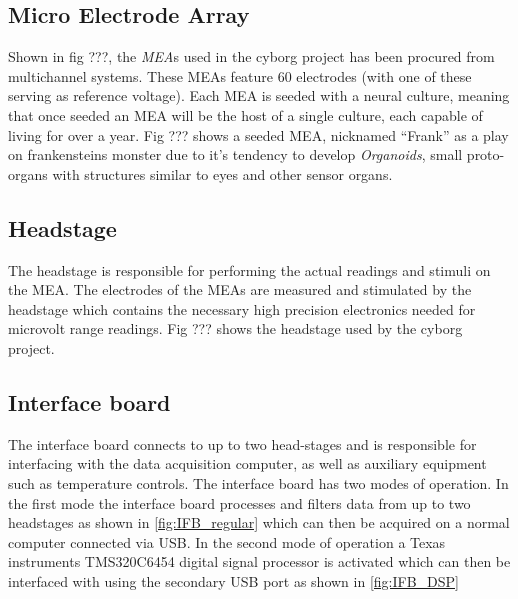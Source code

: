 \subsection{Micro Electrode Array}
Shown in fig ???, the \textit{MEA}s used in the cyborg project has been procured
from multichannel systems.
These MEAs feature 60 electrodes (with one of these serving as reference
voltage).
Each MEA is seeded with a neural culture, meaning that once seeded an MEA will
be the host of a single culture, each capable of living for over a year.
Fig ??? shows a seeded MEA, nicknamed ``Frank'' as a play on frankensteins
monster due to it's tendency to develop \emph{Organoids}, small proto-organs
with structures similar to eyes and other sensor organs.
\subsection{Headstage}
The headstage is responsible for performing the actual readings and stimuli on
the MEA.
The electrodes of the MEAs are measured and stimulated by
the headstage which contains the necessary high precision electronics needed for
microvolt range readings.
Fig ??? shows the headstage used by the cyborg project.
\subsection{Interface board}
The interface board connects to up to two head-stages
and is responsible for interfacing with the data acquisition computer, as well
as auxiliary equipment such as temperature controls. The interface board has two
modes of operation. In the first mode the interface board processes and filters
data from up to two headstages as shown in \ref{fig:IFB_regular} which can then
be acquired on a normal computer connected via USB. In the second mode of
operation a Texas instruments TMS320C6454 digital signal processor is activated
which can then be interfaced with using the secondary USB port as shown in
\ref{fig:IFB_DSP}
